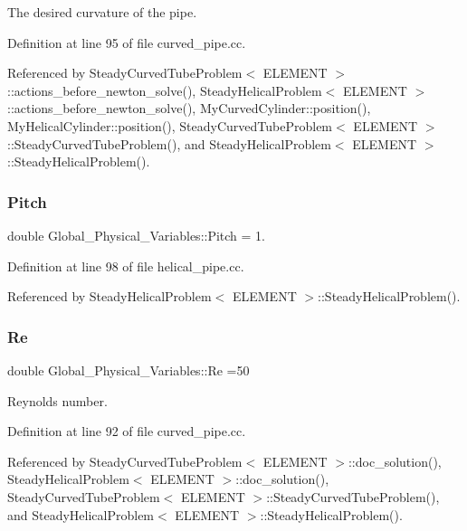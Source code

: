 The desired curvature of the pipe. 



Definition at line 95 of file curved\+\_\+pipe.\+cc.



Referenced by Steady\+Curved\+Tube\+Problem$<$ E\+L\+E\+M\+E\+N\+T $>$\+::actions\+\_\+before\+\_\+newton\+\_\+solve(), Steady\+Helical\+Problem$<$ E\+L\+E\+M\+E\+N\+T $>$\+::actions\+\_\+before\+\_\+newton\+\_\+solve(), My\+Curved\+Cylinder\+::position(), My\+Helical\+Cylinder\+::position(), Steady\+Curved\+Tube\+Problem$<$ E\+L\+E\+M\+E\+N\+T $>$\+::\+Steady\+Curved\+Tube\+Problem(), and Steady\+Helical\+Problem$<$ E\+L\+E\+M\+E\+N\+T $>$\+::\+Steady\+Helical\+Problem().

\mbox{\label{namespaceGlobal__Physical__Variables_aa07c6f0e49eeb97e8b49a3b371274c3e}} 
\subsubsection{\texorpdfstring{Pitch}{Pitch}}
{\footnotesize\ttfamily double Global\+\_\+\+Physical\+\_\+\+Variables\+::\+Pitch = 1.}



Definition at line 98 of file helical\+\_\+pipe.\+cc.



Referenced by Steady\+Helical\+Problem$<$ E\+L\+E\+M\+E\+N\+T $>$\+::\+Steady\+Helical\+Problem().

\mbox{\label{namespaceGlobal__Physical__Variables_ab814e627d2eb5bc50318879d19ab16b9}} 
\subsubsection{\texorpdfstring{Re}{Re}}
{\footnotesize\ttfamily double Global\+\_\+\+Physical\+\_\+\+Variables\+::\+Re =50}



Reynolds number. 



Definition at line 92 of file curved\+\_\+pipe.\+cc.



Referenced by Steady\+Curved\+Tube\+Problem$<$ E\+L\+E\+M\+E\+N\+T $>$\+::doc\+\_\+solution(), Steady\+Helical\+Problem$<$ E\+L\+E\+M\+E\+N\+T $>$\+::doc\+\_\+solution(), Steady\+Curved\+Tube\+Problem$<$ E\+L\+E\+M\+E\+N\+T $>$\+::\+Steady\+Curved\+Tube\+Problem(), and Steady\+Helical\+Problem$<$ E\+L\+E\+M\+E\+N\+T $>$\+::\+Steady\+Helical\+Problem().

